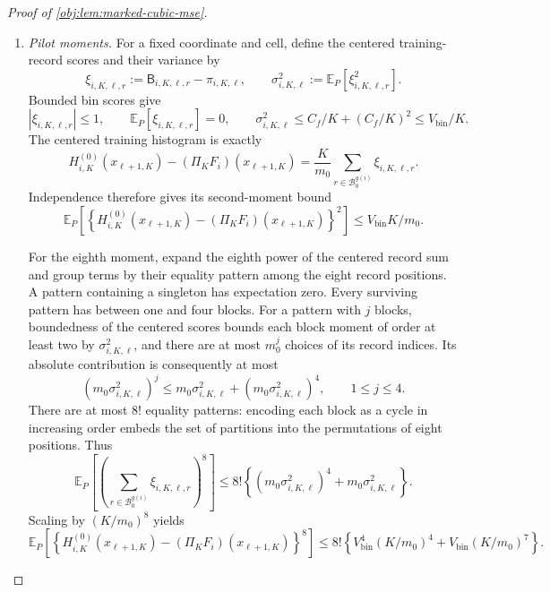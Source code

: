 \begin{proof}[Proof of \cref{obj:lem:marked-cubic-mse}]
\begin{enumerate}
\item \textit{Pilot moments.}
For a fixed coordinate and cell, define the centered training-record scores and their variance by
\[
\xi_{i,K,\ell,r}
:=\mathsf B_{i,K,\ell,r}-\pi_{i,K,\ell},
\qquad
\sigma_{i,K,\ell}^2
:=\mathbb E_P[\xi_{i,K,\ell,r}^2].
\]
Bounded bin scores give
\[
|\xi_{i,K,\ell,r}|\le1,\qquad
\mathbb E_P[\xi_{i,K,\ell,r}]=0,\qquad
\sigma_{i,K,\ell}^2
\le C_f/K+(C_f/K)^2
\le V_{\mathrm{bin}}/K.
\]
The centered training histogram is exactly
\[
H_{i,K}^{(0)}(x_{\ell+1,K})
-(\Pi_KF_i)(x_{\ell+1,K})
=
\frac K{m_0}\sum_{r\in\mathcal B_0^{g(i)}}
\xi_{i,K,\ell,r}.
\]
Independence therefore gives its second-moment bound
\[
\mathbb E_P\!\left[
\left\{H_{i,K}^{(0)}(x_{\ell+1,K})
-(\Pi_KF_i)(x_{\ell+1,K})\right\}^2
\right]
\le V_{\mathrm{bin}}K/m_0.
\]

For the eighth moment, expand the eighth power of the centered record sum and group terms by their equality pattern among the eight record positions. A pattern containing a singleton has expectation zero. Every surviving pattern has between one and four blocks. For a pattern with \(j\) blocks, boundedness of the centered scores bounds each block moment of order at least two by \(\sigma_{i,K,\ell}^2\), and there are at most \(m_0^j\) choices of its record indices. Its absolute contribution is consequently at most
\[
(m_0\sigma_{i,K,\ell}^2)^j
\le m_0\sigma_{i,K,\ell}^2
+(m_0\sigma_{i,K,\ell}^2)^4,
\qquad 1\le j\le4.
\]
There are at most \(8!\) equality patterns: encoding each block as a cycle in increasing order embeds the set of partitions into the permutations of eight positions. Thus
\[
\mathbb E_P\!\left[
\left(\sum_{r\in\mathcal B_0^{g(i)}}\xi_{i,K,\ell,r}\right)^8
\right]
\le8!\left\{
(m_0\sigma_{i,K,\ell}^2)^4
+m_0\sigma_{i,K,\ell}^2
\right\}.
\]
Scaling by \((K/m_0)^8\) yields
\[
\mathbb E_P\!\left[
\left\{H_{i,K}^{(0)}(x_{\ell+1,K})
-(\Pi_KF_i)(x_{\ell+1,K})\right\}^8
\right]
\le8!\left\{
V_{\mathrm{bin}}^4(K/m_0)^4
+V_{\mathrm{bin}}(K/m_0)^7
\right\}.
\]


\end{enumerate}
\end{proof}
